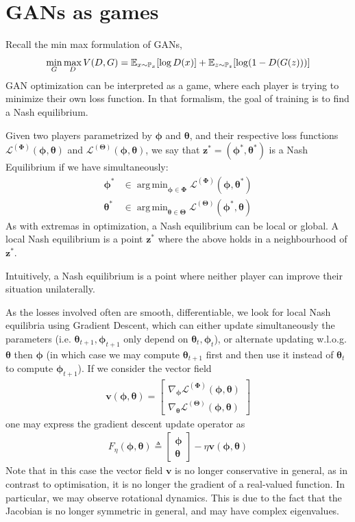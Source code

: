 \documentclass{article}
\DeclareMathOperator*{\argmin}{arg\,min}
\renewcommand{\vec}[1]{\ensuremath{\boldsymbol{#1}}}
\newcommand{\btheta}[0]{\ensuremath{\boldsymbol{\theta}}}
\newcommand{\bphi}[0]{\ensuremath{\boldsymbol{\phi}}}
\newcommand{\ltheta}[0]{\ensuremath{\mathcal{L}^{(\boldsymbol{\Theta})}}}
\newcommand{\lphi}[0]{\ensuremath{\mathcal{L}^{(\boldsymbol{\Phi})}}}
\newcommand{\phth}[0]{\ensuremath{(\boldsymbol{\phi}, \boldsymbol{\theta})}}
\begin{document}
\section{GANs as games}
Recall the min max formulation of GANs,
\begin{equation}
    \min_G \max_D V(D, G) = \mathbb{E}_{x \sim \mathbb{P}_x} [\log D(x)] + \mathbb{E}_{z \sim \mathbb{P}_z} [\log (1-D(G(z)))]
\end{equation}
GAN optimization can be interpreted as a game, where each player is trying to minimize their own loss function. In that formalism, the goal of training is to find a Nash equilibrium.
\begin{defn}
    Given two players parametrized by $\bphi$ and $\btheta$, and their respective loss functions $\lphi \phth$ and $\ltheta \phth$, we say that $\vec{z^*} = (\bphi^*, \btheta^*)$ is a Nash Equilibrium if we have simultaneously:
    \begin{align}
        \bphi^* &\in \argmin_{\bphi\in \vec{\Phi}} \lphi (\bphi, \btheta^*) \nonumber \\
        \btheta^* &\in \argmin_{\btheta\in \vec{\Theta}} \ltheta (\bphi^*, \btheta)
    \end{align}
    As with extremas in optimization, a Nash equilibrium can be local or global. A local Nash equilibrium is a point $\vec{z}^*$ where the above holds in a neighbourhood of $\vec{z}^*$.
\end{defn}
Intuitively, a Nash equilibrium is a point where neither player can improve their situation unilaterally. \\
\par
As the losses involved often are smooth, differentiable, we look for local Nash equilibria using Gradient Descent, which can either update simultaneously the parameters (i.e. $\btheta_{t+1}, \bphi_{t+1}$ only depend on $\btheta_t, \bphi_t$), or alternate updating w.l.o.g. $\btheta$ then $\bphi$ (in which case we may compute $\btheta_{t+1}$ first and then use it instead of $\btheta_t$ to compute $\bphi_{t+1}$). If we consider the vector field
\begin{align}
    \vec{v}\phth = 
    \begin{bmatrix}
        \nabla_{\bphi} \lphi \phth \\
        \nabla_{\btheta} \ltheta \phth
    \end{bmatrix}
\end{align}
one may express the gradient descent update operator as 
\begin{align}
    F_\eta \phth \triangleq \begin{bmatrix}
        \bphi \\
        \btheta
    \end{bmatrix}
    - \eta \vec{v}\phth
\end{align}
Note that in this case the vector field $\vec{v}$ is no longer conservative in general, as in contrast to optimisation, it is no longer the gradient of a real-valued function. In particular, we may observe rotational dynamics. This is due to the fact that the Jacobian is no longer symmetric in general, and may have complex eigenvalues.
\end{document}
